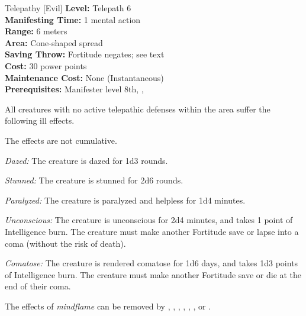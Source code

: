 {Telepathy [Evil]}
{
	\textbf{Level:}
	Telepath 6\\
	\textbf{Manifesting Time:}
	1 mental action\\
	\textbf{Range:}
	6 meters\\
	\textbf{Area:}
	Cone-shaped spread\\
	\textbf{Saving Throw:}
	Fortitude negates; see text\\
	\textbf{Cost:}
	30 power points\\
	\textbf{Maintenance Cost:}
	None (Instantaneous)\\
	\textbf{Prerequisites:}
	Manifester level 8th, , \\
}
{
	All creatures with no active telepathic defenses within the area suffer the following ill effects.


	The effects are not cumulative.

	\textit{Dazed:} The creature is dazed for 1d3 rounds.

	\textit{Stunned:} The creature is stunned for 2d6 rounds.

	\textit{Paralyzed:} The creature is paralyzed and helpless for 1d4 minutes.

	\textit{Unconscious:} The creature is unconscious for 2d4 minutes, and takes 1 point of Intelligence burn. The creature must make another Fortitude save or lapse into a coma (without the risk of death).

	\textit{Comatose:} The creature is rendered comatose for 1d6 days, and takes 1d3 points of Intelligence burn. The creature must make another Fortitude save or die at the end of their coma.

	The effects of \emph{mindflame} can be removed by , , , , , , or .
}
